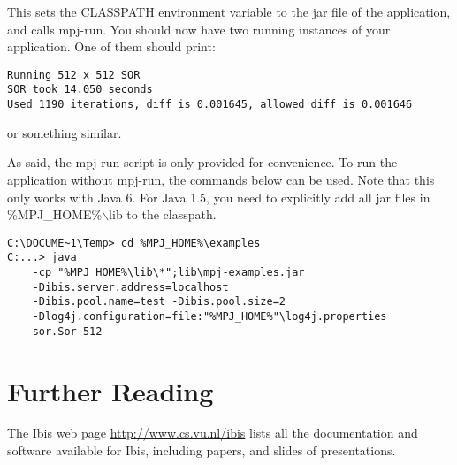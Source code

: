 \documentclass[a4paper,10pt]{article}
\begin{document}
This sets the CLASSPATH environment variable to the jar file of the
application, and calls mpj-run. You should now have two running
instances of your application. One of them should print:

\noindent
{\small
\begin{verbatim}
Running 512 x 512 SOR
SOR took 14.050 seconds
Used 1190 iterations, diff is 0.001645, allowed diff is 0.001646
\end{verbatim}
}
\noindent

or something similar.

As said, the mpj-run script is only provided for convenience. To run
the application without mpj-run, the commands below can be used.
Note that this only works with Java 6. For Java 1.5, you need to
explicitly add all jar files in \%MPJ\_HOME\%$\backslash$lib to the classpath.

\noindent
{\small
\begin{verbatim}
C:\DOCUME~1\Temp> cd %MPJ_HOME%\examples
C:...> java
    -cp "%MPJ_HOME%\lib\*";lib\mpj-examples.jar
    -Dibis.server.address=localhost
    -Dibis.pool.name=test -Dibis.pool.size=2
    -Dlog4j.configuration=file:"%MPJ_HOME%"\log4j.properties
    sor.Sor 512
\end{verbatim}
}
\noindent

\section{Further Reading}

The Ibis web page \url{http://www.cs.vu.nl/ibis} lists all
the documentation and software available for Ibis, including papers, and
slides of presentations.
\end{document}
